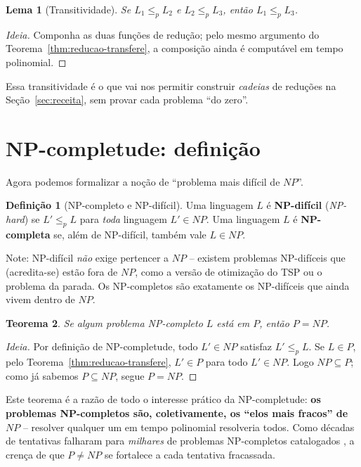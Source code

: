 \documentclass[9pt,a4paper]{extarticle}
\newcommand{\impt}[1]{\textcolor{important}{\textbf{#1}}}
\newtheorem{theorem}{Teorema}[section]
\newtheorem{lemma}[theorem]{Lema}
\theoremstyle{definition}
\newtheorem{definition}{Definição}[section]
\begin{document}
\begin{lemma}[Transitividade]\label{lem:transitividade}
Se \(L_1 \leq_p L_2\) e \(L_2 \leq_p L_3\), então \(L_1 \leq_p L_3\).
\end{lemma}
\begin{proof}[Ideia]
Componha as duas funções de redução; pelo mesmo argumento do Teorema~\ref{thm:reducao-transfere}, a composição ainda é computável em tempo polinomial.
\end{proof}

Essa transitividade é o que vai nos permitir construir \emph{cadeias} de reduções na Seção~\ref{sec:receita}, sem provar cada problema \enquote{do zero}.

\section{NP-completude: definição}\label{sec:npc}

Agora podemos formalizar a noção de \enquote{problema mais difícil de \(NP\)}.

\begin{definition}[NP-completo e NP-difícil]\label{def:npc}
Uma linguagem \(L\) é \impt{NP-difícil} (\emph{NP-hard}) se \(L' \leq_p L\) para \emph{toda} linguagem \(L' \in NP\). Uma linguagem \(L\) é \impt{NP-completa} se, além de NP-difícil, também vale \(L \in NP\).

Note: NP-difícil \emph{não} exige pertencer a \(NP\) -- existem problemas NP-difíceis que (acredita-se) estão fora de \(NP\), como a versão de otimização do TSP ou o problema da parada. Os NP-completos são exatamente os NP-difíceis que ainda vivem dentro de \(NP\).
\end{definition}

\begin{theorem}\label{thm:npc-implica-pnp}
Se algum problema NP-completo \(L\) está em \(P\), então \(P = NP\).
\end{theorem}
\begin{proof}[Ideia]
Por definição de NP-completude, todo \(L' \in NP\) satisfaz \(L' \leq_p L\). Se \(L \in P\), pelo Teorema~\ref{thm:reducao-transfere}, \(L' \in P\) para todo \(L' \in NP\). Logo \(NP \subseteq P\); como já sabemos \(P \subseteq NP\), segue \(P = NP\).
\end{proof}

Este teorema é a razão de todo o interesse prático da NP-completude: \impt{os problemas NP-completos são, coletivamente, os \enquote{elos mais fracos} de \(NP\)} -- resolver qualquer um em tempo polinomial resolveria todos. Como décadas de tentativas falharam para \emph{milhares} de problemas NP-completos catalogados \citep{garey1979}, a crença de que \(P \neq NP\) se fortalece a cada tentativa fracassada.
\end{document}
